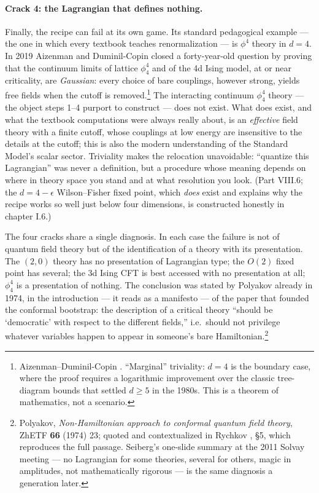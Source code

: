 \paragraph{Crack 4: the Lagrangian that defines nothing.}
Finally, the recipe can fail at its own game. Its standard pedagogical example
--- the one in which every textbook teaches renormalization --- is $\phi^4$
theory in $d = 4$. In 2019 Aizenman and Duminil-Copin closed a forty-year-old
question by proving that the continuum limits of lattice $\phi^4_4$ and of the
4d Ising model, at or near criticality, are \emph{Gaussian}: every choice of
bare couplings, however strong, yields free fields when the cutoff is
removed.\footnote{Aizenman--Duminil-Copin . ``Marginal''
triviality: $d=4$ is the boundary case, where the proof requires a logarithmic
improvement over the classic tree-diagram bounds that settled $d \ge 5$ in the
1980s. This is a theorem of mathematics, not a scenario.} The interacting
continuum $\phi^4_4$ theory --- the object steps 1--4 purport to construct ---
does not exist. What does exist, and what the textbook computations were always
really about, is an \emph{effective} field theory with a finite cutoff, whose
couplings at low energy are insensitive to the details at the cutoff; this is
also the modern understanding of the Standard Model's scalar sector. Triviality
makes the relocation unavoidable: ``quantize this Lagrangian'' was never a
definition, but a procedure whose meaning depends on where in theory space you
stand and at what resolution you look. (Part VIII.6; the $d = 4-\epsilon$
Wilson--Fisher fixed point, which \emph{does} exist and explains why the recipe
works so well just below four dimensions, is constructed honestly in chapter
I.6.)

\medskip

\noin The four cracks share a single diagnosis. In each case the failure is not of quantum
field theory but of the identification of a theory with its presentation.
The $(2,0)$ theory has no presentation of Lagrangian type; the $O(2)$
fixed point has several; the 3d Ising CFT is best accessed with no
presentation at all; $\phi^4_4$ is a presentation of nothing. The
conclusion was stated by Polyakov already in 1974, in the introduction ---
it reads as a manifesto --- of the paper that founded the conformal
bootstrap: the description of a critical theory ``should be `democratic'
with respect to the different fields,'' i.e.\ should not privilege
whatever variables happen to appear in someone's bare
Hamiltonian.\footnote{Polyakov, \emph{Non-Hamiltonian approach to
conformal quantum field theory}, ZhETF \textbf{66} (1974) 23; quoted and
contextualized in Rychkov , \S5, which reproduces the
full passage. Seiberg's one-slide summary at the 2011 Solvay meeting ---
no Lagrangian for some theories, several for others, magic in amplitudes,
not mathematically rigorous --- is the same diagnosis a generation later.}

